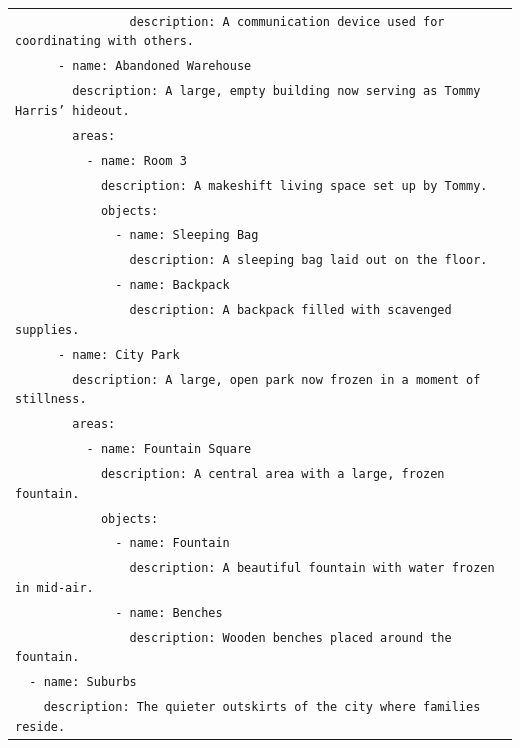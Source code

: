 \documentclass[letterpaper]{article} %
\begin{document}
\begin{small}
\begin{longtable}{p{\textwidth}}
    \texttt{\ \ \ \ \ \ \ \ \ \ \ \ \ \ \ \ description: A communication device used for coordinating with others.} \\
    \texttt{\ \ \ \ \ \ - name: Abandoned Warehouse} \\
    \texttt{\ \ \ \ \ \ \ \ description: A large, empty building now serving as Tommy Harris' hideout.} \\
    \texttt{\ \ \ \ \ \ \ \ areas:} \\
    \texttt{\ \ \ \ \ \ \ \ \ \ - name: Room 3} \\
    \texttt{\ \ \ \ \ \ \ \ \ \ \ \ description: A makeshift living space set up by Tommy.} \\
    \texttt{\ \ \ \ \ \ \ \ \ \ \ \ objects:} \\
    \texttt{\ \ \ \ \ \ \ \ \ \ \ \ \ \ - name: Sleeping Bag} \\
    \texttt{\ \ \ \ \ \ \ \ \ \ \ \ \ \ \ \ description: A sleeping bag laid out on the floor.} \\
    \texttt{\ \ \ \ \ \ \ \ \ \ \ \ \ \ - name: Backpack} \\
    \texttt{\ \ \ \ \ \ \ \ \ \ \ \ \ \ \ \ description: A backpack filled with scavenged supplies.} \\
    \texttt{\ \ \ \ \ \ - name: City Park} \\
    \texttt{\ \ \ \ \ \ \ \ description: A large, open park now frozen in a moment of stillness.} \\
    \texttt{\ \ \ \ \ \ \ \ areas:} \\
    \texttt{\ \ \ \ \ \ \ \ \ \ - name: Fountain Square} \\
    \texttt{\ \ \ \ \ \ \ \ \ \ \ \ description: A central area with a large, frozen fountain.} \\
    \texttt{\ \ \ \ \ \ \ \ \ \ \ \ objects:} \\
    \texttt{\ \ \ \ \ \ \ \ \ \ \ \ \ \ - name: Fountain} \\
    \texttt{\ \ \ \ \ \ \ \ \ \ \ \ \ \ \ \ description: A beautiful fountain with water frozen in mid-air.} \\
    \texttt{\ \ \ \ \ \ \ \ \ \ \ \ \ \ - name: Benches} \\
    \texttt{\ \ \ \ \ \ \ \ \ \ \ \ \ \ \ \ description: Wooden benches placed around the fountain.} \\
    \texttt{\ \ - name: Suburbs} \\
    \texttt{\ \ \ \ description: The quieter outskirts of the city where families reside.} \\

\end{longtable}
\end{small}
\end{document}
